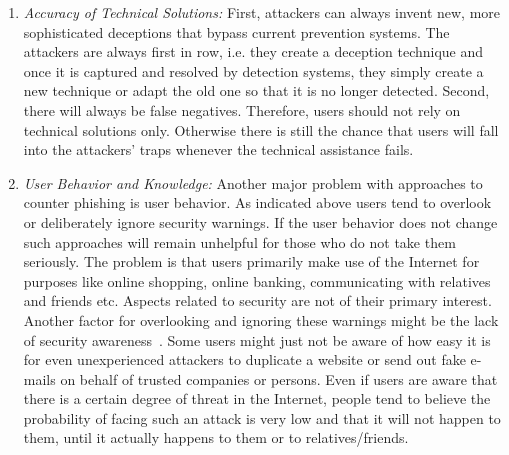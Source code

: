 \begin{enumerate}
	\item\textit{Accuracy of Technical Solutions:} First, attackers can always invent new, more sophisticated deceptions that bypass current prevention systems.
	 The attackers are always first in row, i.e. they create a deception technique and once it is captured and resolved by detection systems, they simply create a new technique or adapt the old one so that it is no longer detected.
	 Second, there will always be false negatives.
Therefore, users should not rely on technical solutions only. 
Otherwise there is still the chance that users will fall into the attackers' traps whenever the technical assistance fails.
	\item\textit{User Behavior and Knowledge:} Another major problem with approaches to counter phishing is user behavior.
 As indicated above users tend to overlook or deliberately ignore security warnings.
 If the user behavior does not change such approaches will remain unhelpful for those who do not take them seriously.
 The problem is that users primarily make use of the Internet for purposes like online shopping, online banking, communicating with relatives and friends etc.
 Aspects related to security are not of their primary interest.
 Another factor for overlooking and ignoring these warnings might be the lack of security awareness~\cite{akhawe2013alice}.
 Some users might just not be aware of how easy it is for even unexperienced attackers to duplicate a website or send out fake e-mails on behalf of trusted companies or persons.
 Even if users are aware that there is a certain degree of threat in the Internet, people tend to believe the probability of facing such an attack is very low and that it will not happen to them, until it actually happens to them or to relatives/friends.
\end{enumerate}

